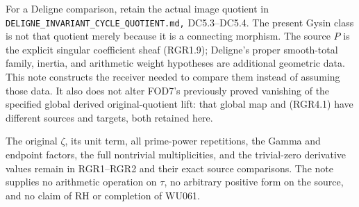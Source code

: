 For a Deligne comparison, retain the actual image quotient in
\nolinkurl{DELIGNE_INVARIANT_CYCLE_QUOTIENT.md,} DC5.3--DC5.4. The
present Gysin class is not that quotient merely because it is a
connecting morphism. The source \(P\) is the explicit singular
coefficient sheaf (RGR1.9); Deligne's proper smooth-total family,
inertia, and arithmetic weight hypotheses are additional geometric data.
This note constructs the receiver needed to compare them instead of
assuming those data. It also does not alter FOD7's previously proved
vanishing of the specified global derived original-quotient lift: that
global map and (RGR4.1) have different sources and targets, both
retained here.

The original \(\zeta\), its unit term, all prime-power repetitions, the
Gamma and endpoint factors, the full nontrivial multiplicities, and the
trivial-zero derivative values remain in RGR1--RGR2 and their exact
source comparisons. The note supplies no arithmetic operation on
\(\tau\), no arbitrary positive form on the source, and no claim of RH
or completion of WU061.
